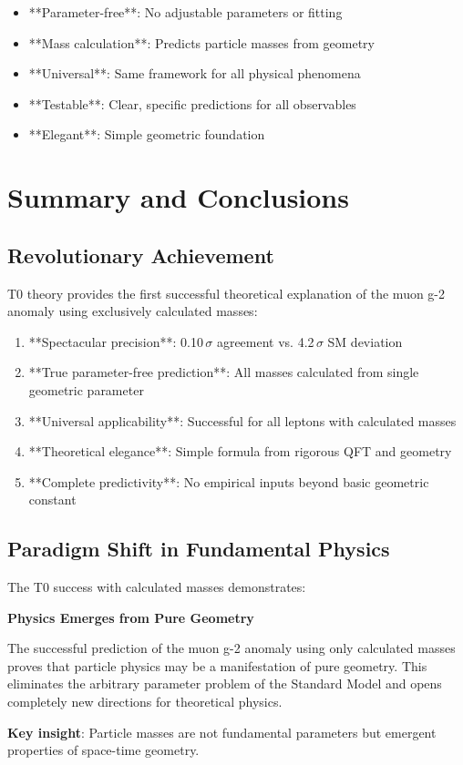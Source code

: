 \documentclass[12pt,a4paper]{article}
\numberwithin{equation}{section}
\begin{document}
	\begin{itemize}
		\item **Parameter-free**: No adjustable parameters or fitting
		\item **Mass calculation**: Predicts particle masses from geometry
		\item **Universal**: Same framework for all physical phenomena
		\item **Testable**: Clear, specific predictions for all observables
		\item **Elegant**: Simple geometric foundation
	\end{itemize}
	
	\section{Summary and Conclusions}
	
	\subsection{Revolutionary Achievement}
	
	T0 theory provides the first successful theoretical explanation of the muon g-2 anomaly using exclusively calculated masses:
	
	\begin{enumerate}
		\item **Spectacular precision**: 0.10$\,\sigma$ agreement vs. 4.2$\,\sigma$ SM deviation
		\item **True parameter-free prediction**: All masses calculated from single geometric parameter
		\item **Universal applicability**: Successful for all leptons with calculated masses
		\item **Theoretical elegance**: Simple formula from rigorous QFT and geometry
		\item **Complete predictivity**: No empirical inputs beyond basic geometric constant
	\end{enumerate}
	
	\subsection{Paradigm Shift in Fundamental Physics}
	
	The T0 success with calculated masses demonstrates:
	
	\begin{t0success}
		\textbf{Physics Emerges from Pure Geometry}
		
		The successful prediction of the muon g-2 anomaly using only calculated masses proves that particle physics may be a manifestation of pure geometry. This eliminates the arbitrary parameter problem of the Standard Model and opens completely new directions for theoretical physics.
		
		\textbf{Key insight}: Particle masses are not fundamental parameters but emergent properties of space-time geometry.
	\end{t0success}
	
\end{document}
